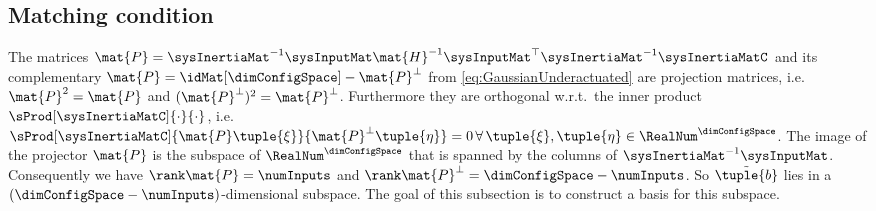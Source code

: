 \subsection{Matching condition}\label{sec:MatchingCondition}
The matrices $\mat{P} = \sysInertiaMat^{-1} \sysInputMat \mat{H}^{-1} \sysInputMat^\top \sysInertiaMat^{-1} \sysInertiaMatC$ and its complementary $\mat{P} = \idMat[\dimConfigSpace] - \mat{P}^\bot$ from \eqref{eq:GaussianUnderactuated} are projection matrices, i.e. $\mat{P}^2 = \mat{P}$ and $(\mat{P}^\bot)^2 = \mat{P}^\bot$.
Furthermore they are orthogonal w.r.t.\ the inner product $\sProd[\sysInertiaMatC]{\cdot}{\cdot}$, i.e.\ $\sProd[\sysInertiaMatC]{\mat{P} \tuple{\xi}}{\mat{P}^\bot\tuple{\eta}} = 0 \, \forall\, \tuple{\xi},\tuple{\eta}\in \RealNum^{\dimConfigSpace}$.
The image of the projector $\mat{P}$ is the subspace of $\RealNum^{\dimConfigSpace}$ that is spanned by the columns of $\sysInertiaMat^{-1} \sysInputMat$.
Consequently we have $\rank\mat{P} = \numInputs$ and $\rank\mat{P}^\bot = \dimConfigSpace-\numInputs$.
So $\tilde{\tuple{b}}$ lies in a $(\dimConfigSpace-\numInputs)$-dimensional subspace.
The goal of this subsection is to construct a basis for this subspace.

